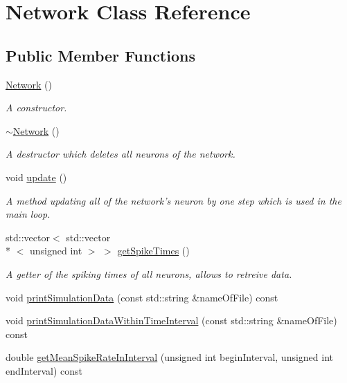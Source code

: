 \hypertarget{classNetwork}{\section{Network Class Reference}
\label{classNetwork}
}
\subsection*{Public Member Functions}
\begin{DoxyCompactItemize}
\item 
\hyperlink{classNetwork_a3cc2fb4f8fa4d507077e8da85ce5a1c8}{Network} ()
\begin{DoxyCompactList}\small\item\em A constructor. \end{DoxyCompactList}\item 
\hypertarget{classNetwork_a7a4e19cdb4bf0c7ecf82baa643831492}{\hyperlink{classNetwork_a7a4e19cdb4bf0c7ecf82baa643831492}{$\sim$\-Network} ()}\label{classNetwork_a7a4e19cdb4bf0c7ecf82baa643831492}

\begin{DoxyCompactList}\small\item\em A destructor which deletes all neurons of the network. \end{DoxyCompactList}\item 
\hypertarget{classNetwork_ab07bb6f6d9020b9eb230551083ea929f}{void \hyperlink{classNetwork_ab07bb6f6d9020b9eb230551083ea929f}{update} ()}\label{classNetwork_ab07bb6f6d9020b9eb230551083ea929f}

\begin{DoxyCompactList}\small\item\em A method updating all of the network's neuron by one step which is used in the main loop. \end{DoxyCompactList}\item 
\hypertarget{classNetwork_a618d267c0962f59027c0d063aa2b4533}{std\-::vector$<$ std\-::vector\\*
$<$ unsigned int $>$ $>$ \hyperlink{classNetwork_a618d267c0962f59027c0d063aa2b4533}{get\-Spike\-Times} ()}\label{classNetwork_a618d267c0962f59027c0d063aa2b4533}

\begin{DoxyCompactList}\small\item\em A getter of the spiking times of all neurons, allows to retreive data. \end{DoxyCompactList}\item 
void \hyperlink{classNetwork_a222e084554183af355833cda07a83877}{print\-Simulation\-Data} (const std\-::string \&name\-Of\-File) const 
\item 
void \hyperlink{classNetwork_a8909c07d0e6e292f5ca54e56a797ebe0}{print\-Simulation\-Data\-Within\-Time\-Interval} (const std\-::string \&name\-Of\-File) const 
\item 
double \hyperlink{classNetwork_ac82435bb56bf5eabfdd3e3f4afadea2b}{get\-Mean\-Spike\-Rate\-In\-Interval} (unsigned int begin\-Interval, unsigned int end\-Interval) const 
\end{DoxyCompactItemize}
